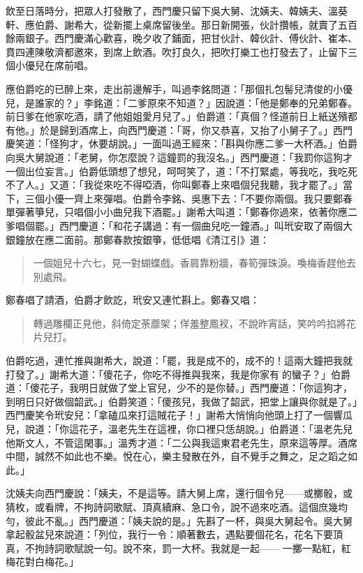 飲至日落時分，把眾人打發散了，西門慶只留下吳大舅、沈姨夫、韓姨夫、溫葵軒、應伯爵、謝希大，從新擺上桌席留後坐。那日新開張，伙計攢帳，就賣了五百餘兩銀子。西門慶滿心歡喜，晚夕收了鋪面，把甘伙計、韓伙計、傅伙計、崔本、賁四連陳敬濟都邀來，到席上飲酒。吹打良久，把吹打樂工也打發去了，止留下三個小優兒在席前唱。

應伯爵吃的已醉上來，走出前邊解手，叫過李銘問道：「那個扎包髻兒清俊的小優兒，是誰家的？」李銘道：「二爹原來不知道？」因說道：「他是鄭奉的兄弟鄭春。前日爹在他家吃酒，請了他姐姐愛月兒了。」伯爵道：「真個？怪道前日上紙送殯都有他。」於是歸到酒席上，向西門慶道：「哥，你又恭喜，又抬了小舅子了。」西門慶笑道：「怪狗才，休要胡說。」一面叫過王經來：「斟與你應二爹一大杯酒。」伯爵向吳大舅說道：「老舅，你怎麼說？這鐘罰的我沒名。」西門慶道：「我罰你這狗才一個出位妄言。」伯爵低頭想了想兒，呵呵笑了，道：「不打緊處，等我吃，我吃死不了人。」又道：「我從來吃不得啞酒，你叫鄭春上來唱個兒我聽，我才罷了。」當下，三個小優一齊上來彈唱。伯爵令李銘、吳惠下去：「不要你兩個。我只要鄭春單彈著箏兒，只唱個小小曲兒我下酒罷。」謝希大叫道：「鄭春你過來，依著你應二爹唱個罷。」西門慶道：「和花子講過：有一個曲兒吃一鐘酒。」叫玳安取了兩個大銀鐘放在應二面前。那鄭春款按銀箏，低低唱《清江引》道：
\begin{quote}
一個姐兒十六七，見一對蝴蝶戲。香肩靠粉牆，春筍彈珠淚。喚梅香趕他去別處飛。
\end{quote}

鄭春唱了請酒，伯爵才飲訖，玳安又連忙斟上。鄭春又唱：
\begin{quote}
轉過雕欄正見他，斜倚定荼蘼架；佯羞整鳳衩，不說昨宵話，笑吟吟掐將花片兒打。
\end{quote}

伯爵吃過，連忙推與謝希大，說道：「罷，我是成不的，成不的！這兩大鐘把我就打發了。」謝希大道：「傻花子，你吃不得推與我來，我是你家有𣬼的蠻子？」伯爵道：「傻花子，我明日就做了堂上官兒，少不的是你替。」西門慶道：「你這狗才，到明日只好做個韶武。」伯爵笑道：「傻孩兒，我做了韶武，把堂上讓與你就是了。」西門慶笑令玳安兒：「拿磕瓜來打這賊花子！」謝希大悄悄向他頭上打了一個響瓜兒，說道：「你這花子，溫老先生在這裡，你口裡只恁胡說。」伯爵道：「溫老先兒他斯文人，不管這閑事。」溫秀才道：「二公與我這東君老先生，原來這等厚。酒席中間，誠然不如此也不樂。悅在心，樂主發散在外，自不覺手之舞之，足之蹈之如此。」

沈姨夫向西門慶說：「姨夫，不是這等。請大舅上席，還行個令兒——或擲骰，或猜枚，或看牌，不拘詩詞歌賦、頂真續麻、急口令，說不過來吃酒。這個庶幾均勻，彼此不亂。」西門慶道：「姨夫說的是。」先斟了一杯，與吳大舅起令。吳大舅拿起骰盆兒來說道：「列位，我行一令：順著數去，遇點要個花名，花名下要頂真，不拘詩詞歌賦說一句。說不來，罰一大杯。我就是一起——
一擲一點紅，紅梅花對白梅花。」

